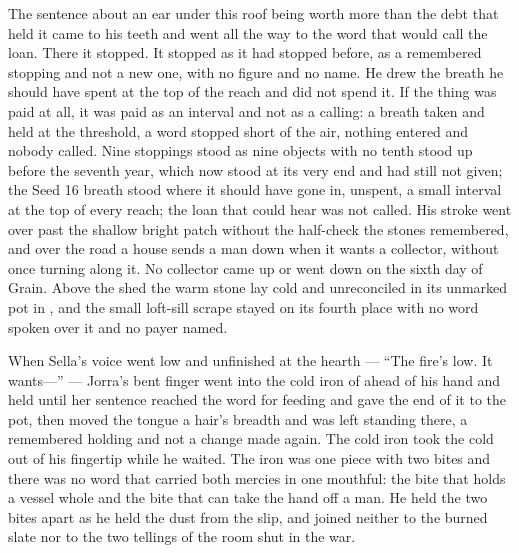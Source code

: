 The sentence about an ear under this roof being worth more than the debt that held it came to his teeth and went all the way to the word that would call the loan. There it stopped. It stopped as it had stopped before, as a remembered stopping and not a new one, with no figure and no name. He drew the breath he should have spent at the top of the reach and did not spend it. If the thing was paid at all, it was paid as an interval and not as a calling: a breath taken and held at the threshold, a word stopped short of the air, nothing entered and nobody called. Nine stoppings stood as nine objects with no tenth stood up before the seventh year, which now stood at its very end and had still not given; the Seed 16 breath stood where it should have gone in, unspent, a small interval at the top of every reach; the loan that could hear was not called. His stroke went over  past the shallow bright patch without the half-check the stones remembered, and over the road a house sends a man down when it wants a collector, without once turning along it. No collector came up or went down  on the sixth day of Grain. Above the shed the warm stone lay cold and unreconciled in its unmarked pot in , and the small loft-sill scrape stayed on its fourth place with no word spoken over it and no payer named.

When Sella's voice went low and unfinished at the hearth --- “The fire's low. It wants---” --- Jorra's bent finger went into the cold iron of  ahead of his hand and held until her sentence reached the word for feeding and gave the end of it to the pot, then moved the tongue a hair's breadth and was left standing there, a remembered holding and not a change made again. The cold iron took the cold out of his fingertip while he waited. The iron was one piece with two bites and there was no  word that carried both mercies in one mouthful: the bite that holds a vessel whole and the bite that can take the hand off a man. He held the two bites apart as he held the dust from the slip, and joined neither to the burned slate nor to the two tellings of the room shut in the war.

\scenebreak


